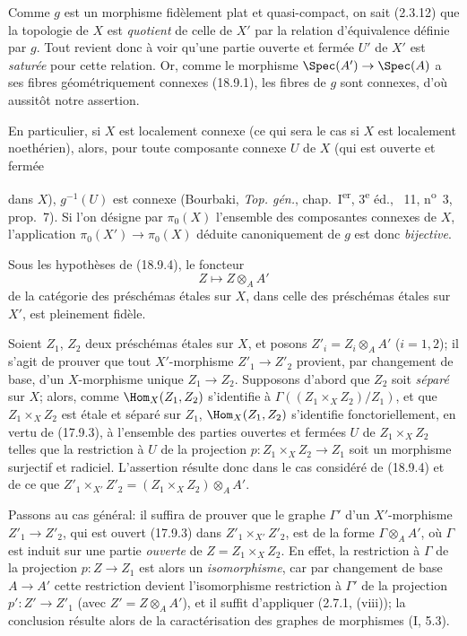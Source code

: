 Comme $g$ est un morphisme fidèlement plat et quasi-compact, on sait (2.3.12) que la topologie de $X$ est \emph{quotient} de celle de $X'$ par la relation d'équivalence définie par $g$. Tout revient donc à voir qu'une partie ouverte et fermée $U'$ de $X'$ est \emph{saturée} pour cette relation. Or, comme le morphisme $\Spec(A')\to\Spec(A)$ a ses fibres géométriquement connexes (18.9.1), les fibres de $g$ sont connexes, d'où aussitôt notre assertion.

En particulier, si $X$ est localement connexe (ce qui sera le cas si $X$ est localement noethérien), alors, pour toute composante connexe $U$ de $X$ (qui est ouverte et fermée


dans $X$), $g^{-1}(U)$ est connexe (Bourbaki, \emph{Top. gén.}, chap.~I\textsuperscript{er}, 3\textsuperscript{e} éd., \textsection~11, n\textsuperscript{o}~3, prop.~7). Si l'on désigne par $\pi_0(X)$ l'ensemble des composantes connexes de $X$, l'application $\pi_0(X')\to\pi_0(X)$ déduite canoniquement de $g$ est donc \emph{bijective}.

\begin{corollary}[18.9.5]
\label{IV.18.9.5}
Sous les hypothèses de (18.9.4), le foncteur
\begin{equation}
  Z\longmapsto Z\otimes_A A'
  \tag{18.9.5.1}
  \label{IV.18.9.5.1}
\end{equation}
de la catégorie des préschémas étales sur $X$, dans celle des préschémas étales sur $X'$, est pleinement fidèle.
\end{corollary}

Soient $Z_1$, $Z_2$ deux préschémas étales sur $X$, et posons $Z'_i=Z_i\otimes_A A'$ ($i=1,2$); il s'agit de prouver que tout $X'$-morphisme $Z'_1\to Z'_2$ provient, par changement de base, d'un $X$-morphisme unique $Z_1\to Z_2$. Supposons d'abord que $Z_2$ soit \emph{séparé} sur $X$; alors, comme $\Hom_X(Z_1,Z_2)$ s'identifie à $\Gamma((Z_1\times_X Z_2)/Z_1)$, et que $Z_1\times_X Z_2$ est étale et séparé sur $Z_1$, $\Hom_X(Z_1,Z_2)$ s'identifie fonctoriellement, en vertu de (17.9.3), à l'ensemble des parties ouvertes et fermées $U$ de $Z_1\times_X Z_2$ telles que la restriction à $U$ de la projection $p:Z_1\times_X Z_2\to Z_1$ soit un morphisme surjectif et radiciel. L'assertion résulte donc dans le cas considéré de (18.9.4) et de ce que $Z'_1\times_{X'}Z'_2=(Z_1\times_X Z_2)\otimes_A A'$.

Passons au cas général: il suffira de prouver que le graphe $\Gamma'$ d'un $X'$-morphisme $Z'_1\to Z'_2$, qui est ouvert (17.9.3) dans $Z'_1\times_{X'}Z'_2$, est de la forme $\Gamma\otimes_A A'$, où $\Gamma$ est induit sur une partie \emph{ouverte} de $Z=Z_1\times_X Z_2$. En effet, la restriction à $\Gamma$ de la projection $p:Z\to Z_1$ est alors un \emph{isomorphisme}, car par changement de base $A\to A'$ cette restriction devient l'isomorphisme restriction à $\Gamma'$ de la projection $p':Z'\to Z'_1$ (avec $Z'=Z\otimes_A A'$), et il suffit d'appliquer (2.7.1, (viii)); la conclusion résulte alors de la caractérisation des graphes de morphismes (I, 5.3).

